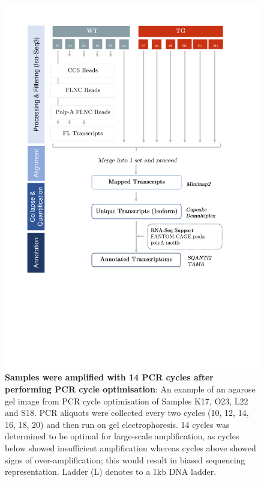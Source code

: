\vspace{1cm}
\begin{figure}[!htp]
	\centering
	\includegraphics[page=2,trim={2.5cm 25cm 0cm 0cm},clip,scale = 1]{Figures/WholeTranscriptome_Figures.pdf}
	\captionsetup{width=0.95\textwidth}
	\caption[Iso-Seq Whole Transcriptome - PCR cycle optimisation]%
	{\textbf{Samples were amplified with 14 PCR cycles after performing PCR cycle optimisation}: An example of an agarose gel image from PCR cycle optimisation of Samples K17, O23, L22 and S18. PCR aliquots were collected every two cycles (10, 12, 14, 16, 18, 20) and then run on gel electrophoresis. 14 cycles was determined to be optimal for large-scale amplification, as cycles below showed insufficient amplification whereas cycles above showed signs of over-amplification; this would result in biased sequencing representation. Ladder (L) denotes to a 1kb DNA ladder.}
	\label{fig:isoseq_whole_pccresults}
\end{figure}

